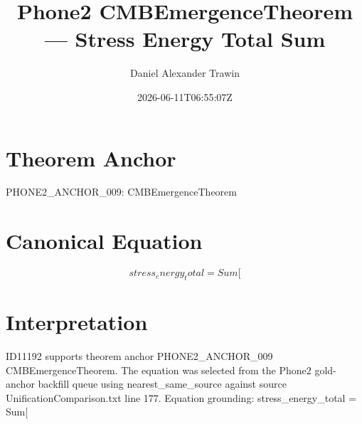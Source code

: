 \documentclass[11pt]{article}
\title{Phone2 CMBEmergenceTheorem — Stress Energy Total Sum}
\author{Daniel Alexander Trawin}
\date{2026-06-11T06:55:07Z}
\begin{document}
\maketitle
\section*{Theorem Anchor}
PHONE2_ANCHOR_009: CMBEmergenceTheorem
\section*{Canonical Equation}
\[
stress_energy_total = Sum[
\]
\section*{Interpretation}
ID11192 supports theorem anchor PHONE2_ANCHOR_009 CMBEmergenceTheorem. The equation was selected from the Phone2 gold-anchor backfill queue using nearest_same_source against source UnificationComparison.txt line 177. Equation grounding: stress_energy_total = Sum[
\end{document}
